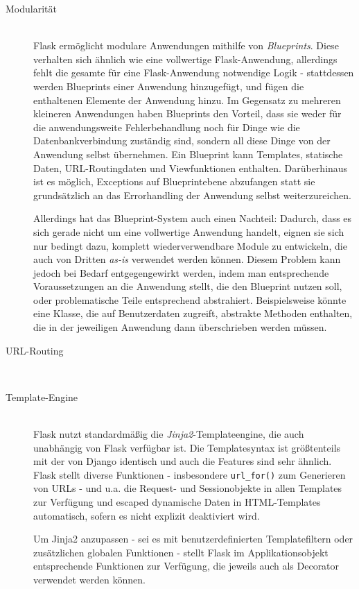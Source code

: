 \begin{description}
\item[Modularität] \hfill \\
Flask ermöglicht modulare Anwendungen mithilfe von \emph{Blueprints}. Diese verhalten sich ähnlich
wie eine vollwertige Flask-Anwendung, allerdings fehlt die gesamte für eine Flask-Anwendung
notwendige Logik - stattdessen werden Blueprints einer Anwendung hinzugefügt, und fügen die
enthaltenen Elemente der Anwendung hinzu. Im Gegensatz zu mehreren kleineren Anwendungen haben
Blueprints den Vorteil, dass sie weder für die anwendungsweite Fehlerbehandlung noch für Dinge wie
die Datenbankverbindung zuständig sind, sondern all diese Dinge von der Anwendung selbst übernehmen.
Ein Blueprint kann Templates, statische Daten, URL-Routingdaten und Viewfunktionen enthalten.
Darüberhinaus ist es möglich, Exceptions auf Blueprintebene abzufangen statt sie grundsätzlich an
das Errorhandling der Anwendung selbst weiterzureichen.

Allerdings hat das Blueprint-System auch einen Nachteil: Dadurch, dass es sich gerade nicht um eine
vollwertige Anwendung handelt, eignen sie sich nur bedingt dazu, komplett wiederverwendbare Module
zu entwickeln, die auch von Dritten \emph{as-is} verwendet werden können. Diesem Problem kann jedoch
bei Bedarf entgegengewirkt werden, indem man entsprechende Voraussetzungen an die Anwendung stellt,
die den Blueprint nutzen soll, oder problematische Teile entsprechend abstrahiert. Beispielsweise
könnte eine Klasse, die auf Benutzerdaten zugreift, abstrakte Methoden enthalten, die in der
jeweiligen Anwendung dann überschrieben werden müssen.


\item[URL-Routing] \hfill \\


\item[Template-Engine] \hfill \\
Flask nutzt standardmäßig die \emph{Jinja2}-Templateengine, die auch unabhängig von Flask verfügbar
ist. Die Templatesyntax ist größtenteils mit der von Django identisch und auch die Features sind
sehr ähnlich. Flask stellt diverse Funktionen - insbesondere \lstinline{url_for()} zum Generieren
von URLs - und u.a. die Request- und Sessionobjekte in allen Templates zur Verfügung und escaped
dynamische Daten in HTML-Templates automatisch, sofern es nicht explizit deaktiviert wird.

Um Jinja2 anzupassen - sei es mit benutzerdefinierten Templatefiltern oder zusätzlichen globalen
Funktionen - stellt Flask im Applikationsobjekt entsprechende Funktionen zur Verfügung, die jeweils
auch als Decorator verwendet werden können.


\end{description}
